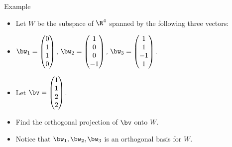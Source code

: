 \documentclass{beamer}
\begin{document}
\begin{frame}{Example}
\begin{itemize}
\item Let $W$ be the subspace of $\R^4$ spanned by the following three vectors:
\item $
\bw_1=
\begin{pmatrix}
0  \\
1  \\
1\\
0
\end{pmatrix}
\text{, }
\bw_2=
\begin{pmatrix}
1 \\
0\\
0 \\
-1
\end{pmatrix}
\text{, }
\bw_3=
\begin{pmatrix}
1 \\
1 \\
-1 \\
1
\end{pmatrix}
.$
\item Let $\bv=
\begin{pmatrix}
1 \\
1 \\
2 \\
2
\end{pmatrix}
$.
\item Find the orthogonal projection of $\bv$ onto $W$.
\item Notice that $\bw_1,\bw_2,\bw_3$ is an orthogonal basis for $W$.
\end{itemize}
\end{frame}
\end{document}
